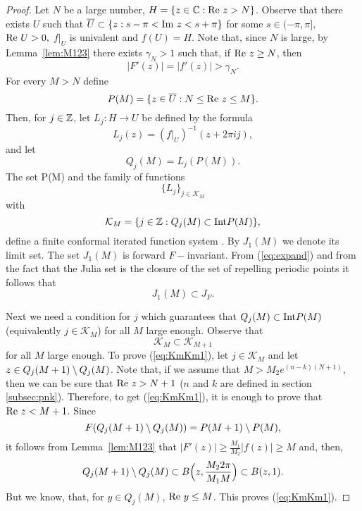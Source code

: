 \begin{proof}
  Let $N$ be a large number, $H =\{z\in{\mathbb C}: \textrm{Re } z>N\}$. Observe that there
  exists $U$ such that $\overline{U}\subset \{z: s-\pi <\textrm{Im } z < s+{\pi} \}$
  for some $s\in(-\pi,\pi],$ $\textrm{Re } U>0,$ $f|_U$ is univalent and $f(U)=H$.
  Note that, since $N$ is large, by Lemma~\ref{lem:M123} there exists
  $\gamma_N>1$ such that, if $\textrm{Re } z\geq N$, then
  \begin{equation}
    \label{eq:expand}
    |F'(z)|=|f'(z)|>\gamma_N.
  \end{equation}
  For every $M>N$ define
  \[
  P(M) =\{z\in \overline{U}:N\leq\textrm{Re } z\leq M\}.
  \]
  Then, for $j\in{\mathbb Z}$, let $L_j:H\rightarrow U$ be defined by the
  formula
  \[
  L_j(z)=(f|_U)^{-1}(z+2\pi i j),
  \]
  and let
  \begin{equation}\label{subs:J1}
  Q_j(M)=L_j(P(M)).
  \end{equation}
  The set P(M) and the family of functions
  \[
  \{L_j\}_{j\in \mathcal{K}_M}
  \]
  with
  \[
  \mathcal{K}_M=\{j\in{\mathbb Z}:Q_j(M)\subset \text{{\rm Int}} P(M)\},
  \]
  define a finite conformal iterated function system .  By $J_1(M)$ we
  denote its limit set.  The set $J_1(M)$ is forward $F-$invariant.  From
  (\ref{eq:expand}) and from the fact that the Julia set is the closure of
  the set of repelling periodic points it follows that
  \begin{equation} \label{eq:J1NJFa}
  J_1(M)\subset J_{F}.
  \end{equation}
  
  Next we need a condition for $j$ which guarantees that $Q_j(M)\subset\text{{\rm Int}}
  P(M)$ (equivalently $j\in \mathcal{K}_M$) for all $M$ large
  enough. Observe that
  \begin{equation} \label{eq:KmKm1}
  \mathcal{K}_{M}\subset\mathcal{K}_{M+1}
  \end{equation}
  for all $M$ large enough.  To prove (\ref{eq:KmKm1}), let $j\in
  \mathcal{K}_M$ and let $z\in Q_j(M+1)\setminus Q_j(M)$. Note that, if we assume
  that $M>M_2e^{(n-k)(N+1)}$, then we can be sure that $\textrm{Re } z > N+1$ ($n$
  and $k$ are defined in section \ref{subsec:pnk}).  Therefore, to get
  (\ref{eq:KmKm1}), it is enough to prove that $\textrm{Re } z < M+1$.  Since
  \[
  F(Q_j(M+1)\setminus Q_j(M))=P(M+1)\setminus P(M),
  \]
  it follows from Lemma~\ref{lem:M123} that
  $|F'(z)|\geq\frac{M_1}{M_2}|f(z)|\geq M$ and, then,
  \[
  Q_j(M+1)\setminus Q_j(M)\subset B\Big(z,\frac{M_2 2\pi}{M_1 M}\Big)\subset
  B(z,1).
  \]
  But we know, that, for $y\in Q_j(M)$, $\textrm{Re } y \leq M$. This proves
  (\ref{eq:KmKm1}).
\end{proof}

